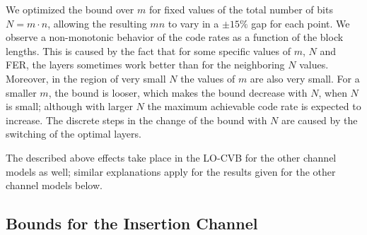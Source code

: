 \documentclass[journal, twocol]{IEEEtran}
\begin{document}
We optimized the bound over $m$ for fixed values of the total number of bits $N=m\cdot n$, allowing the resulting $mn$ to vary in a $\pm 15\%$ gap for each point. We observe a non-monotonic behavior of the code rates as a function of the block lengths. This is caused by the fact that for some specific values of $m$, $N$ and FER, the layers sometimes work better than for the neighboring $N$ values.
Moreover, in the region of very small $N$ the values of $m$ are also very small.
For a smaller $m$, the bound is looser, which makes the bound decrease with $N$, when $N$ is small; although with larger $N$ the maximum achievable code rate is expected to increase.
The discrete steps in the change of the bound with $N$ are caused by the switching of the optimal layers.

The described above effects take place in the LO-CVB for the other channel models as well; similar explanations apply for the results given for the other channel models below.

\subsection{Bounds for the Insertion Channel}
\label{s:nri}
\end{document}
